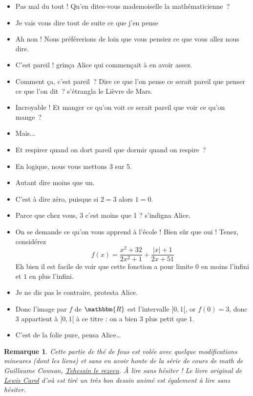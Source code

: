 \documentclass[a4paper,12pt]{book}
\newcommand{\eR}{\mathbbm{R}}
\newcounter{numtho}
\theoremstyle{mes_exemples}	\newtheorem{exemple}[numtho]{Exemple}
\newtheorem{remark}[numtho]{Remarque}
\theoremstyle{mes_tho}
\begin{document}
\begin{itemize}
\item Pas mal du tout ! Qu'en dites-vous mademoiselle la mathématicienne~?
\item Je vais vous dire tout de suite ce que j'en pense
\item Ah non ! Nous préférerions de loin que vous pensiez ce que vous allez nous dire.
\item C'est pareil ! grinça Alice qui commençait à en avoir assez.
\item Comment ça, c'est pareil~? Dire ce que l'on pense ce serait pareil que penser ce que l'on dit~? s'étrangla le Lièvre de Mars.
\item Incroyable ! Et manger ce qu'on voit ce serait pareil que voir ce qu'on mange~?
\item Mais...
\item Et respirer quand on dort pareil que dormir quand on respire~?
\item En logique, nous vous mettons 3 sur 5.
\item Autant dire moins que un.
\item C'est à dire zéro, puisque si $2=3$ alors $1=0$.
\item Parce que chez vous, 3 c'est moins que 1 ? s'indigna Alice.
\item On se demande ce qu'on vous apprend à l'école ! Bien sûr que oui ! Tenez, considérez
		\[ 
			f(x)=\frac{x^2+32}{2x^2+1}+\frac{|x|+1}{2x+51}
		\]
Eh bien il est facile de voir que cette fonction a pour limite $0$ en moins l'infini et $1$ en plus l'infini.
\item Je ne dis pas le contraire, protesta Alice.
\item Donc l'image par $f$ de $\eR$ est l'intervalle $]0,1[$, or $f(0)=3$, donc $3$ appartient à $]0,1[$ à ce titre : on a bien $3$ plus petit que $1$.
\item C'est de la folie pure, pensa Alice\ldots
\end{itemize}


\begin{remark}
Cette partie de thé de fous est volée avec quelque modifications mineures (dont les liens) et sans en avoir honte de la série de cours de math de Guillaume Connan, \href{http://gconnan.free.fr/}{Tehessin le rezeen}. À lire sans hésiter ! Le livre original de \href{http://fr.wikipedia.org/wiki/Lewis_Carroll}{Lewis Carol} d'où est tiré un très bon dessin animé est également à lire sans hésiter.
\end{remark}
\end{document}
